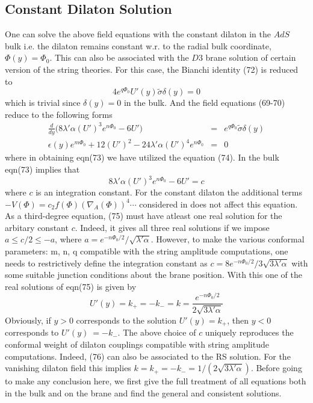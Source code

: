 \documentclass[a4paper,12pt]{article}
\newcommand {\nn} {\nonumber}
\begin{document}
\subsection{Constant Dilaton Solution}
One can solve the above field equations with the constant 
dilaton in the $AdS$ bulk i.e. the dilaton remains constant w.r. to the 
radial bulk coordinate, $\Phi(y)=\Phi_0$. This can also be associated with 
the $D3$ brane solution of certain version of the string theories. For this 
case, the Bianchi identity (72) is reduced to 
\begin{equation}
4e^{q\Phi_0}U'(y)\tilde{\sigma}\delta(y)=0\nn
\end{equation}
which is trivial since $\delta(y)=0$ in the bulk. And the field equations 
(69-70) reduce to the following forms
\begin{eqnarray}
\frac{d}{dy}\big(8\lambda'\alpha (U')^3 e^{n\Phi_0}-6U'\big)
&=&e^{q\Phi_0}\tilde{\sigma} \delta(y)\\
\epsilon(y)e^{m\Phi_0}+12(U')^2-24\lambda'\alpha (U')^4 e^{n\Phi_0}&=&0
\end{eqnarray}
where in obtaining eqn(73) we have utilized the equation (74). In the bulk 
eqn(73) implies that
\begin{equation}
8\lambda'\alpha (U')^3 e^{n\Phi_0}-6U'= c
\end{equation}
where $c$ is an integration constant. For the constant dilaton the 
additional terms $-V(\Phi)=c_2f(\Phi)(\nabla_A(\Phi))^4\cdots$ considered in 
\cite{NIC} does not affect this equation. As a third-degree equation, (75) 
must have atleast one real solution for the arbitary constant $c$. 
Indeed, it gives all three real solutions if we impose $a\leq c/2\leq -a$, 
where $a=e^{-n\Phi_0/2}/\sqrt{\lambda'\alpha}$. However, to make the various 
conformal parameters: m, n, q compatible with the string 
amplitude computations, one needs to restrictively define the integration 
constant as  $c=8 e^{-n\Phi_0/2}/{3\sqrt{3\lambda'\alpha}}$ with some 
suitable junction conditions about the brane position. With this one of the 
real solutions of eqn(75) is given by 
\begin{equation}
U'(y)=k_+=-k_-=k=\frac{e^{-n\Phi_0/2}}{2\sqrt{3\lambda'\alpha}}
\end{equation}
Obviously, if $y>0$ corresponds to the solution $U'(y)=k_+$, then $y<0$ 
corresponds to $U'(y)~=-k_-$. The above choice of $c$ uniquely reproduces 
the conformal weight of dilaton 
couplings compatible with string amplitude computations. Indeed, 
(76) can also be associated to the RS solution. For the vanishing dilaton 
field this implies $k=k_+=-k_-=1/{(2\sqrt{3\lambda'\alpha})}$. 
Before going to make any conclusion here, we first 
give the full treatment of all equations both in the bulk and on 
the brane and find the general and consistent solutions.
\end{document}
